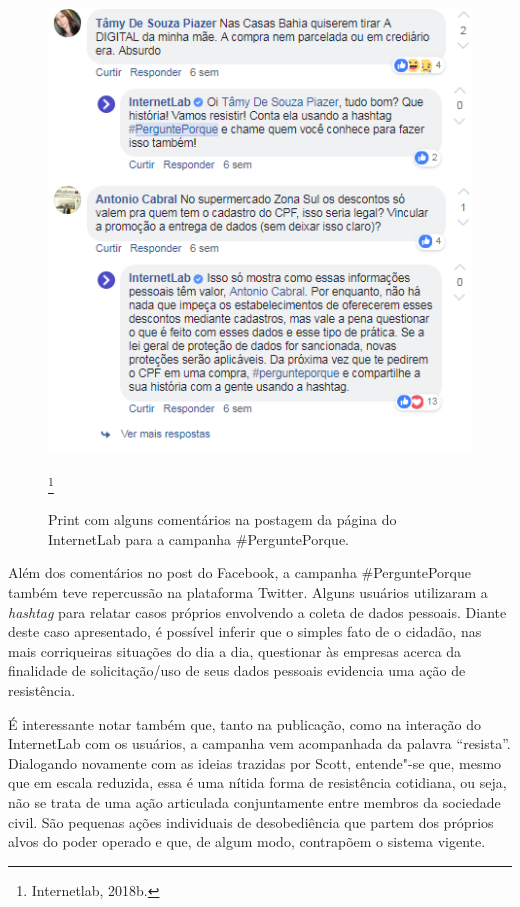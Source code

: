 \begin{figure}[!ht]
\includegraphics[width=\textwidth]{./imgs/grafico6.png}
\caption{\formular\footnotesize{Print com alguns comentários na postagem da página do InternetLab para a campanha \#PerguntePorque.}}\footnote{Internetlab, 2018b.}
 \end{figure}


Além dos comentários no post do Facebook, a campanha \#PerguntePorque
também teve repercussão na plataforma Twitter. Alguns usuários
utilizaram a \emph{hashtag} para relatar casos próprios envolvendo a
coleta de dados pessoais. Diante deste caso apresentado, é possível
inferir que o simples fato de o cidadão, nas mais corriqueiras situações
do dia a dia, questionar às empresas acerca da finalidade de
solicitação/uso de seus dados pessoais evidencia uma ação de
resistência.

É interessante notar também que, tanto na publicação, como na interação
do InternetLab com os usuários, a campanha vem acompanhada da palavra
``resista''. Dialogando novamente com as ideias trazidas por Scott,
entende"-se que, mesmo que em escala reduzida, essa é uma nítida forma de
resistência cotidiana, ou seja, não se trata de uma ação articulada
conjuntamente entre membros da sociedade civil. São pequenas ações
individuais de desobediência que partem dos próprios alvos do poder
operado e que, de algum modo, contrapõem o sistema vigente.

